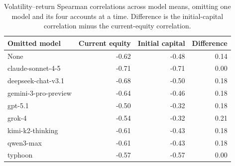 \begin{table}[htbp]
\centering\small
\caption{Volatility--return Spearman correlations across model means,
omitting one model and its four accounts at a time. Difference is the
initial-capital correlation minus the current-equity correlation.}
\label{tab:feedbackloo}
\begin{tabular}{lrrr}
\toprule
Omitted model & Current equity & Initial capital & Difference \\
\midrule
None & -0.62 & -0.48 & 0.14 \\
claude-sonnet-4-5 & -0.71 & -0.71 & 0.00 \\
deepseek-chat-v3.1 & -0.68 & -0.50 & 0.18 \\
gemini-3-pro-preview & -0.64 & -0.46 & 0.18 \\
gpt-5.1 & -0.50 & -0.32 & 0.18 \\
grok-4 & -0.54 & -0.32 & 0.21 \\
kimi-k2-thinking & -0.61 & -0.43 & 0.18 \\
qwen3-max & -0.61 & -0.43 & 0.18 \\
typhoon & -0.57 & -0.57 & 0.00 \\
\bottomrule
\end{tabular}
\end{table}
